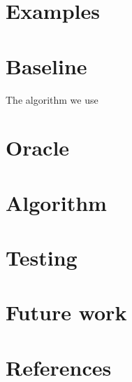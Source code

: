 \documentclass[12pt, a4paper]{article}
\begin{document}
\section{Examples}

\section{Baseline}
The algorithm we use

\section{Oracle}

\section{Algorithm}


\section{Testing}

\section{Future work}

\section{References}
\end{document}

